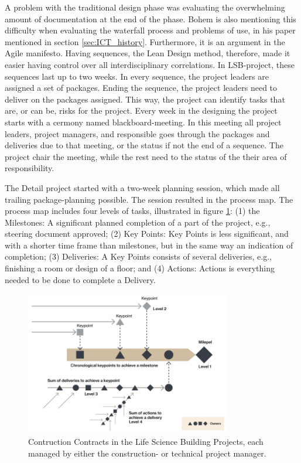 A problem with the traditional design phase was evaluating the overwhelming amount of documentation at the end of the phase. Bohem is also mentioning this difficulty when evaluating the waterfall process and problems of use, in his paper mentioned in section \ref{sec:ICT_history}. Furthermore, it is an argument in the Agile manifesto. Having sequences, the Lean Design method, therefore, made it easier having control over all interdisciplinary correlations. In LSB-project, these sequences last up to two weeks. In every sequence, the project leaders are assigned a set of packages. Ending the sequence, the project leaders need to deliver on the packages assigned. This way, the project can identify tasks that are, or can be, risks for the project. Every week in the designing the project starts with a cermony named blackboard-meeting. In this meeting all project leaders, project managers, and responsible goes through the packages and deliveries due to that meeting, or the status if not the end of a sequence. The project chair the meeting, while the rest need to the status of the their area of responsibility. 

The Detail project started with a two-week planning session, which made all trailing package-planning possible. The session resulted in the process map. The process map includes four levels of tasks, illustrated in figure \ref{fig:Milestones-Keypoints-Deliveries-Actions}: (1) the Milestones: A significant planned completion of a part of the project, e.g., steering document approved; (2) Key Points: Key Points is less significant, and with a shorter time frame than milestones, but in the same way an indication of completion; (3) Deliveries: A Key Points consists of several deliveries, e.g., finishing a room or design of a floor; and (4) Actions: Actions is everything needed to be done to complete a Delivery. 

\begin{figure}
    \centering
    \includegraphics[width=0.8\textwidth]{fig/LSB_task_levels.png}
    \caption{Contruction Contracts in the Life Science Building Projects, each managed by either the construction- or technical project manager.}
    \label{fig:Milestones-Keypoints-Deliveries-Actions}
\end{figure}

